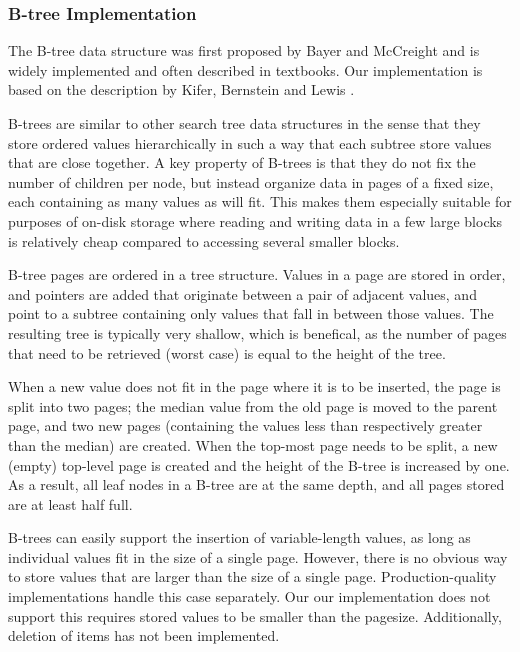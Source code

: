 \documentclass{acm_proc_article-sp}
\begin{document}
\subsubsection{B-tree Implementation}
The B-tree data structure was first proposed by Bayer and McCreight
\cite{bayer1970oam} and is widely implemented and often described in
textbooks. Our implementation is based on the description by Kifer, Bernstein
and Lewis \cite{kifer2006dsa}.

B-trees are similar to other search tree data structures in the sense that
they store ordered values hierarchically in such a way that each subtree store
values that are close together.
A key property of B-trees is that they do not fix the number of children per node, but instead organize data in pages of a fixed size, each containing
as many values as will fit. This makes them especially suitable for purposes
of on-disk storage where reading and writing data in a few large blocks is
relatively cheap compared to accessing several smaller blocks.

B-tree pages are ordered in a tree structure. Values in a page are stored
in order, and pointers are added that originate between a pair of adjacent
values, and point to a subtree containing only values that fall in between those
values. The resulting tree is typically very shallow, which is benefical,
as the number of pages that need to be retrieved (worst case) is equal to
the height of the tree.

When a new value does not fit in the page where it is to be inserted,
the page is split into two pages; the median value from the old page is
moved to the parent page, and two new pages (containing the values less
than respectively greater than the median) are created. When the top-most
page needs to be split, a new (empty) top-level page is created and the height
of the B-tree is increased by one. As a result, all leaf nodes in a B-tree are
at the same depth, and all pages stored are at least half full.


B-trees can easily support the insertion of variable-length values, as long
as individual values fit in the size of a single page. However, there is no
obvious way to store values that are larger than the size of a single page.
Production-quality implementations handle this case separately. Our our
implementation does not support this requires stored values to
be smaller than the pagesize. Additionally, deletion of items has not been
implemented.
\end{document}
